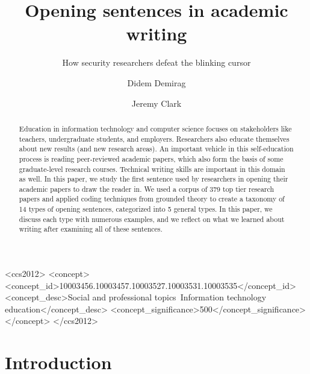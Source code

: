 \documentclass[sigconf,anonymous]{acmart}
\begin{document}
	
\title{Opening sentences in academic writing}
\subtitle{How security researchers defeat the blinking cursor}

\author{Didem Demirag}
\author{Jeremy Clark}
	
\begin{abstract}

Education in information technology and computer science focuses on stakeholders like teachers, undergraduate students, and employers. Researchers also educate themselves about new results (and new research areas). An important vehicle in this self-education process is reading peer-reviewed academic papers, which also form the basis of some graduate-level research courses. Technical writing skills are important in this domain as well. In this paper, we study the first sentence used by researchers in opening their academic papers to draw the reader in. We used a corpus of 379 top tier research papers and applied coding techniques from grounded theory to create a taxonomy of 14 types of opening sentences, categorized into 5 general types. In this paper, we discuss each type with numerous examples, and we reflect on what we learned about writing after examining all of these sentences.

\end{abstract}
	
\begin{CCSXML}
<ccs2012>
   <concept>
       <concept_id>10003456.10003457.10003527.10003531.10003535</concept_id>
       <concept_desc>Social and professional topics~Information technology education</concept_desc>
       <concept_significance>500</concept_significance>
       </concept>
 </ccs2012>
\end{CCSXML}

	
	
\maketitle
	
	
\section{Introduction}
 
\end{document}
